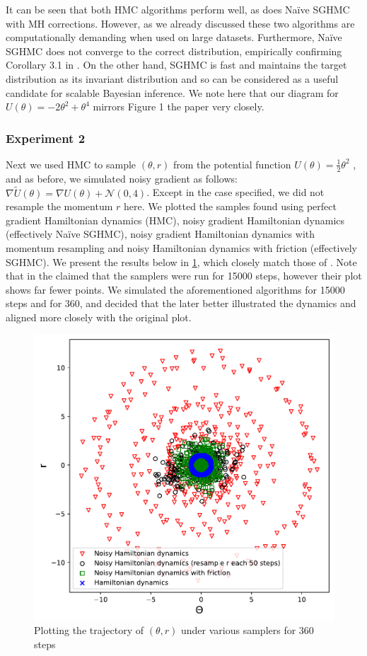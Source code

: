 It can be seen that both HMC algorithms perform well, as does Naïve SGHMC with MH corrections. However, as we already discussed these two algorithms are computationally demanding when used on large datasets. Furthermore, Naïve SGHMC does not converge to the correct distribution, empirically confirming Corollary 3.1 in \cite{sghmc}. On the other hand, SGHMC is fast and maintains the target distribution as its invariant distribution and so can be considered as a useful candidate for scalable Bayesian inference. We note here that our diagram for $U(\theta) = -2\theta^2 + \theta^4$ mirrors Figure 1 the paper very closely.
\subsubsection*{Experiment 2}
Next we used HMC to sample $(\theta, r)$ from the potential function $U(\theta) = \frac{1}{2}\theta^2$ , and as before, we simulated noisy gradient as follows: $\nabla \widetilde{U}(\theta) = \nabla U(\theta) + \mathcal{N}(0,4)$. Except in the case specified, we did not resample the momentum $r$ here. We plotted the samples found using perfect gradient Hamiltonian dynamics (HMC), noisy gradient Hamiltonian dynamics (effectively Naïve SGHMC), noisy gradient Hamiltonian dynamics with momentum resampling and noisy Hamiltonian dynamics with friction (effectively SGHMC). We present the results below in \cref{fig:theta_r_samples}, which closely match those of \cite{sghmc}. Note that in \cite{sghmc} the \citeauthor{sghmc} claimed that the samplers were run for 15000 steps, however their plot shows far fewer points. We simulated the aforementioned algorithms for 15000 steps and for 360, and decided that the later better illustrated the dynamics and aligned more closely with the original plot.
\begin{figure}[h!]
    \centering
    \includegraphics[width=0.9\linewidth]{parts/Images/fig2a.pdf}%
    \caption{Plotting the trajectory of $(\theta, r)$ under various samplers for 360 steps}
     \label{fig:theta_r_samples}%
\end{figure}
